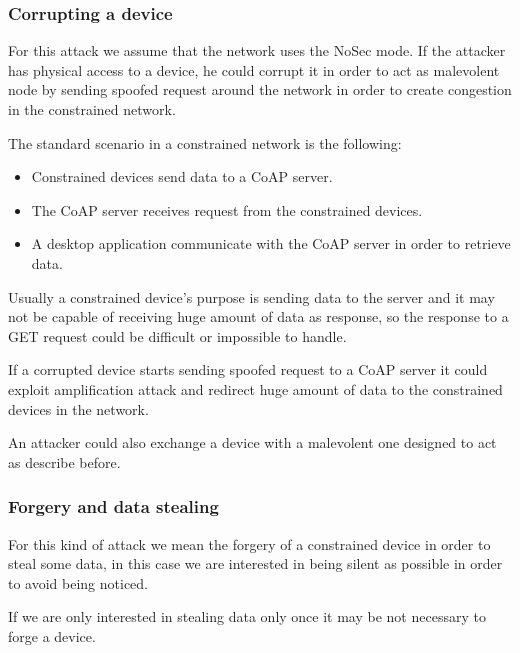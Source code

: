 	\subsubsection{Corrupting a device}
	For this attack we assume that the network uses the NoSec mode.\newline
	If the attacker has physical access to a device, he could corrupt it in order to act as malevolent node by sending spoofed request around the network in order to create congestion in the constrained network.\newline
	
	The standard scenario in a constrained network is the following:
	\begin{itemize}
		\item Constrained devices send data to a CoAP server.
		\item The CoAP server receives request from the constrained devices.
		\item A desktop application communicate with the CoAP server in order to retrieve data.
	\end{itemize}

	Usually a constrained device's purpose is sending data to the server and it may not be capable of receiving huge amount of data as response, so the response to a GET request could be difficult or impossible to handle.\newline
	
	If a corrupted device starts sending spoofed request to a CoAP server it could exploit amplification attack and redirect huge amount of data to the constrained devices in the network.\newline
	
	An attacker could also exchange a device with a malevolent one designed to act as describe before.\newline
	
	\subsubsection{Forgery and data stealing}
	For this kind of attack we mean the forgery of a constrained device in order to steal some data, in this case we are interested in being silent as possible in order to avoid being noticed.\newline
	
	If we are only interested in stealing data only once it may be not necessary to forge a device.\newline
	
